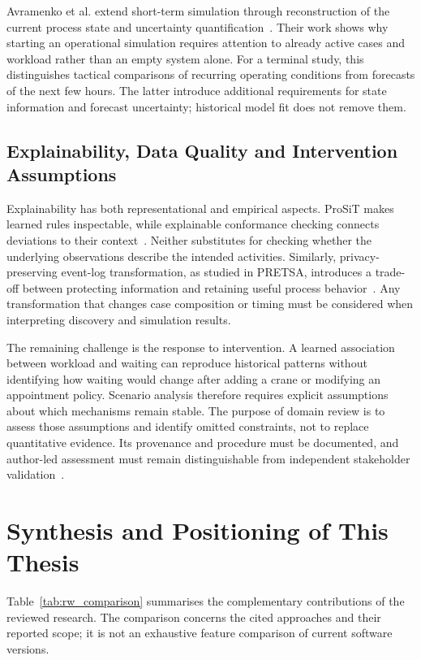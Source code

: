 Avramenko et al. extend short-term simulation through reconstruction of the current process state and uncertainty quantification~\cite{RWAvramenko2026ShortTerm}. Their work shows why starting an operational simulation requires attention to already active cases and workload rather than an empty system alone. For a terminal study, this distinguishes tactical comparisons of recurring operating conditions from forecasts of the next few hours. The latter introduce additional requirements for state information and forecast uncertainty; historical model fit does not remove them.

\subsection{Explainability, Data Quality and Intervention Assumptions}

Explainability has both representational and empirical aspects. ProSiT makes learned rules inspectable, while explainable conformance checking connects deviations to their context~\cite{Vinci2026prosit,RWMehr2023Explainable}. Neither substitutes for checking whether the underlying observations describe the intended activities. Similarly, privacy-preserving event-log transformation, as studied in PRETSA, introduces a trade-off between protecting information and retaining useful process behavior~\cite{FahrenkrogPetersen2019PRETSA}. Any transformation that changes case composition or timing must be considered when interpreting discovery and simulation results.

The remaining challenge is the response to intervention. A learned association between workload and waiting can reproduce historical patterns without identifying how waiting would change after adding a crane or modifying an appointment policy. Scenario analysis therefore requires explicit assumptions about which mechanisms remain stable. The purpose of domain review is to assess those assumptions and identify omitted constraints, not to replace quantitative evidence. Its provenance and procedure must be documented, and author-led assessment must remain distinguishable from independent stakeholder validation~\cite{Sulis2026SimulationReview,Sargent2013Validation}.

\section{Synthesis and Positioning of This Thesis}
\label{sec:rw_positioning}

Table~\ref{tab:rw_comparison} summarises the complementary contributions of the reviewed research. The comparison concerns the cited approaches and their reported scope; it is not an exhaustive feature comparison of current software versions.

